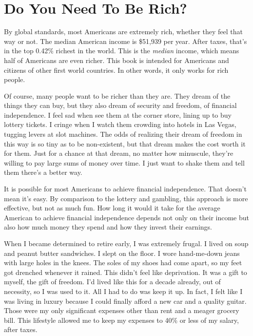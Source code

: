 \chapter{Do You Need To Be Rich?}
By global standards, most Americans are extremely rich, whether they feel that way or not. The median American income is \$51,939 per year.\cite{fed-reserve-median-income} After taxes, that's in the top 0.42\% richest in the world.\cite{globalrichlist} This is the \emph{median} income, which means half of Americans are even richer. This book is intended for Americans and citizens of other first world countries. In other words, it only works for rich people.

Of course, many people want to be richer than they are. They dream of the things they can buy, but they also dream of security and freedom, of financial independence. I feel sad when see them at the corner store, lining up to buy lottery tickets. I cringe when I watch them crowding into hotels in Las Vegas, tugging levers at slot machines. The odds of realizing their dream of freedom in this way is so tiny as to be non-existent, but that dream makes the cost worth it for them. Just for a chance at that dream, no matter how minuscule, they're willing to pay large sums of money over time. I just want to shake them and tell them there's a better way.

It is possible for most Americans to achieve financial independence. That doesn't mean it's easy. By comparison to the lottery and gambling, this approach is more effective, but not as much fun. How long it would it take for the average American to achieve financial independence depends not only on their income but also how much money they spend and how they invest their earnings.

When I became determined to retire early, I was extremely frugal. I lived on soup and peanut butter sandwiches. I slept on the floor. I wore hand-me-down jeans with large holes in the knees. The soles of my shoes had come apart, so my feet got drenched whenever it rained. This didn't feel like deprivation. It was a gift to myself, the gift of freedom. I'd lived like this for a decade already, out of necessity, so I was used to it. All I had to do was keep it up. In fact, I felt like I was living in luxury because I could finally afford a new car and a quality guitar. Those were my only significant expenses other than rent and a meager grocery bill. This lifestyle allowed me to keep my expenses to 40\% or less of my salary, after taxes.

